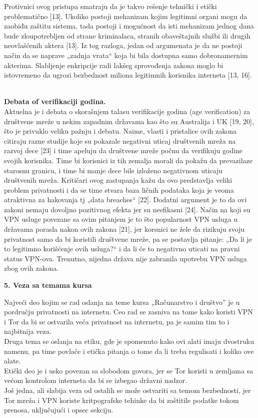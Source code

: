 \documentclass[
]{article}
\begin{document}
Protivnici ovog pristupa smatraju da je takvo rešenje tehnički i etički
problematično {[}13{]}. Ukoliko postoji mehanizam kojim legitimni organi
mogu da zaobiđu zaštitu sistema, tada postoji i mogućnost da isti
mehanizam jednog dana bude zloupotrebljen od strane kriminalaca, stranih
obaveštajnih službi ili drugih neovlašćenih aktera {[}13{]}. Iz tog
razloga, jedan od argumenata je da ne postoji način da se naprave
„zadnja vrata`` koja bi bila dostupna samo dobronamernim akterima.
Slabljenje enkripcije radi lakšeg sprovođenja zakona moglo bi
istovremeno da ugrozi bezbednost miliona legitimnih korisnika interneta
{[}13, 16{]}.\\
\strut \\
\textbf{Debata of verifikaciji godina.}\\
Aktuelna je i debata o skorašnjem talasu verifikacije godina (age
verification) za društvene mreže u nekim zapadnim državama kao što su
Australija i UK {[}19, 20{]}, što je privuklo veliku pažnju i debatu.
Naime, vlasti i pristalice ovih zakona citiraju razne studije koje su
pokazale negativni uticaj društvenih mreža na razvoj dece {[}23{]} i
time apeluju da društvene mreže počnu da verifikuju godine svojih
korisnika. Time bi korisnici iz tih zemalja morali da pokažu da
prevazilaze starosnu granicu, i time bi manje dece bile izloženo
negativnom uticaju društvenih mreža. Kritičari ovog zastupanja kažu da
ovo predstavlja veliki problem privatnosti i da se time stvara baza
ličnih podataka koja je veoma atraktivna za hakovanja tj „data
breaches`` {[}22{]}. Dodatni argument je to da ovi zakoni nemaju
dovoljno pozitivnog efekta jer su neefikasni {[}24{]}. Način na koji su
VPN usluge povezane sa ovim pitanjem je to što popularnost VPN usluga u
državama porasla nakon ovih zakona {[}21{]}, jer korsnici ne žele da
rizikuju svoju privatnost samo da bi koristili društvene mreže, pa se
postavlja pitanje: „Da li je to legitimno korišćenje ovih usluga?{}`` i
da li će to negativno uticati na pravni status VPN-ova. Trenutno,
nijedna država nije zabranila upotrebu VPN usluga zbog ovih zakona.

\protect\hypertarget{_Toc234141050}{}{}\textbf{5. Veza sa temama kursa}

Najveći deo kojim se rad oslanja na teme kursa „Računarstvo i društvo''
je u pordručju privatnosti na internetu. Ceo rad se zasniva na tome kako
koristi VPN i Tor da bi se ostvarila veća privatnost na internetu, pa je
samim tim to i najbitnija veza.\\
Druga tema se oslanja na etiku, gde je spomenuto kako ovi alati imaju
dvostruku namenu, pa time povlače i etička pitanja o tome da li treba
regulisati i koliko ove alate.\\
Etički deo je i usko povezan sa slobodom govora, jer se Tor koristi u
zemljama sa većom kontrolom interneta da bi se izbegao državni nadzor.\\
Još jedna, ali slabija veza od ostalih se može ostvariti sa temom
bezbednosti, jer Tor mreža i VPN koriste kritpografske tehinke da bi
zaštitile podatke tokom prenosa, uključujući i opsec sekciju.
\end{document}
